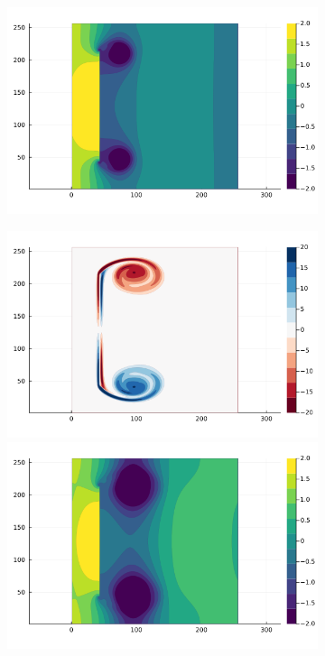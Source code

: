 \documentclass{article}
\begin{document}
\begin{figure}
\begin{subfigure}{.33\textwidth}
        \includegraphics[trim={4cm 1.5cm 5cm 7cm},clip,width=\textwidth]{tex/fig/Disk_reflect_press_2.png}
    \end{subfigure}%
    \begin{subfigure}{.33\textwidth}
        \centering
         \includegraphics[trim={4cm 7.2cm 5cm 1cm},clip,width=\textwidth]{tex/fig/Disk_reflect_omega_3.png}
        \includegraphics[trim={4cm 1.5cm 5cm 7cm},clip,width=\textwidth]{tex/fig/Disk_reflect_press_3.png}

\end{subfigure}
\end{figure}
\end{document}
